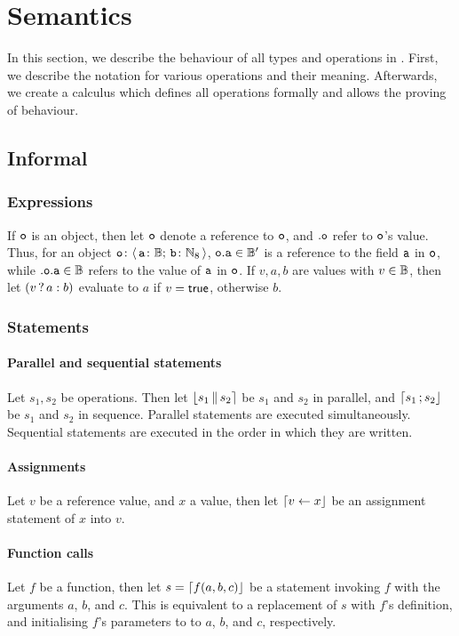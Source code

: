 \section{Semantics}
In this section, we describe the behaviour of all types and operations in \tetra.
First, we describe the notation for various operations and their meaning.
Afterwards, we create a calculus which defines all operations formally and allows the proving of behaviour.

\subsection{Informal\optional}

\subsubsection{Expressions}
If $\mathtt{o}$ is an object, then let $\mathtt{o}$ denote a reference to $\mathtt{o}$, and ${.}\mathtt{o}$ refer to $\mathtt{o}$'s value.
Thus, for an object
	$\var{o}{\struct{\var{a}{\bool}}{\var{b}{\N_8}}}$,
	$\memb{\cn o}{a} \in \reft\bool$ is a reference to the field $\mathtt{a}$ in $\mathtt{o}$, while
	$\val{\memb{\cn o}{a}} \in \bool$ refers to the value of $\mathtt{a}$ in $\mathtt{o}$.
If $v,a,b$ are values with $v \in \mathbb{B}$, then let
	$\left(v\,?\,a:b\right)$
	evaluate to $a$ if $v = \mathsf{true}$, otherwise $b$.

\subsubsection{Statements}
\paragraph{Parallel and sequential statements}
Let $s_1, s_2$ be operations.
Then let $\parstmt{s_1}{s_2}$ be $s_1$ and $s_2$ in parallel, and
	$\stmt{s_1}{s_2}$ be $s_1$ and $s_2$ in sequence.
Parallel statements are executed simultaneously.
Sequential statements are executed in the order in which they are written.

\paragraph{Assignments}
Let $v$ be a reference value, and $x$ a value, then let $\stmt{v \gets x}$ be an assignment statement of $x$ into $v$.

\paragraph{Function calls}
Let $f$ be a function, then let $s = \stmt{f(a,b,c)}$ be a statement invoking $f$ with the arguments $a$, $b$, and $c$.
This is equivalent to a replacement of $s$ with $f$'s definition, and initialising $f$'s parameters to to $a$, $b$, and $c$, respectively.

